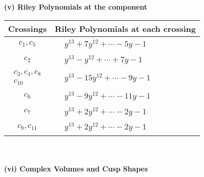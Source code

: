 \documentclass[1p]{elsarticle_modified}
\theoremstyle{definition}
\begin{document}
\newpage\renewcommand{\arraystretch}{1}
\flushleft \textbf{(v) Riley Polynomials at the component}\newline \\
\begin{tabular}{m{50pt}|m{274pt}}
Crossings & \hspace{64pt}Riley Polynomials at each crossing \\
\hline $$\begin{aligned}c_{1},c_{5}\end{aligned}$$&$\begin{aligned}
&y^{13}+7 y^{12}+\cdots-5 y-1
\end{aligned}$\\
\hline $$\begin{aligned}c_{2}\end{aligned}$$&$\begin{aligned}
&y^{13}- y^{12}+\cdots+7 y-1
\end{aligned}$\\
\hline $$\begin{aligned}c_{3},c_{4},c_{8}\\c_{10}\end{aligned}$$&$\begin{aligned}
&y^{13}-15 y^{12}+\cdots-9 y-1
\end{aligned}$\\
\hline $$\begin{aligned}c_{6}\end{aligned}$$&$\begin{aligned}
&y^{13}-9 y^{12}+\cdots-11 y-1
\end{aligned}$\\
\hline $$\begin{aligned}c_{7}\end{aligned}$$&$\begin{aligned}
&y^{13}+2 y^{12}+\cdots-2 y-1
\end{aligned}$\\
\hline $$\begin{aligned}c_{9},c_{11}\end{aligned}$$&$\begin{aligned}
&y^{13}+2 y^{12}+\cdots-2 y-1
\end{aligned}$\\
\hline
\end{tabular}\\~\\
\newpage\flushleft \textbf{(vi) Complex Volumes and Cusp Shapes}
\end{document}
